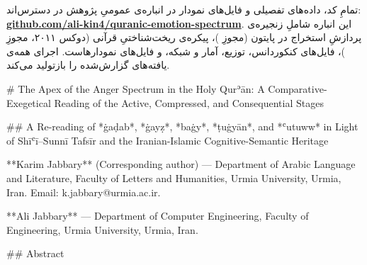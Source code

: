 \begin{RTL}
\begin{otherlanguage}{persian}
تمامِ کد، داده‌های تفصیلی و فایل‌های نمودار در انباره‌ی عمومیِ پژوهش در
دسترس‌اند:
\textbf{\href{https://github.com/ali-kin4/quranic-emotion-spectrum}{github.com/ali-kin4/quranic-emotion-spectrum}}.
این انباره شاملِ زنجیره‌ی پردازشِ استخراج در پایتون (مجوزِ )، پیکره‌ی
ریخت‌شناختیِ قرآنی (دوکس ۲۰۱۱، مجوزِ )، فایل‌های  کنکوردانس،
توزیع، آمار و شبکه، و فایل‌های  نمودارهاست. اجرای
همه‌ی یافته‌های گزارش‌شده را بازتولید می‌کند.

\end{otherlanguage}
\end{RTL}

\newpage

\begin{LTR}

# The Apex of the Anger Spectrum in the Holy Qurʾān: A Comparative-Exegetical Reading of the Active, Compressed, and Consequential Stages

## A Re-reading of *ġaḍab*, *ġayẓ*, *baġy*, *ṭuġyān*, and *ʿutuww* in Light of Shīʿī–Sunnī Tafsīr and the Iranian-Islamic Cognitive-Semantic Heritage

**Karim Jabbary** (Corresponding author) — Department of Arabic Language and Literature, Faculty of Letters and Humanities, Urmia University, Urmia, Iran. Email: k.jabbary@urmia.ac.ir.

**Ali Jabbary** — Department of Computer Engineering, Faculty of Engineering, Urmia University, Urmia, Iran.

## Abstract


\end{LTR}
